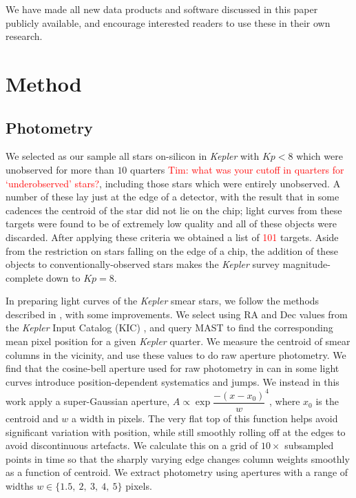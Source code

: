 \documentclass[a4paper,fleqn,usenatbib]{mnras}
\newcommand{\kepler}{\emph{Kepler}\xspace}
\begin{document}
We have made all new data products and software discussed in this paper publicly available, and encourage interested readers to use these in their own research.   

\section{Method}
\label{method}

\subsection{Photometry}
\label{photometry}

We selected as our sample all stars on-silicon in \kepler with $Kp<8$ which were unobserved for more than $10$ quarters \textcolor{red}{Tim: what was your cutoff in quarters for `underobserved' stars?}, including those stars which were entirely unobserved. A number of these lay just at the edge of a detector, with the result that in some cadences the centroid of the star did not lie on the chip; light curves from these targets were found to be of extremely low quality and all of these objects were discarded. After applying these criteria we obtained a list of \textcolor{red}{101} targets. Aside from the restriction on stars falling on the edge of a chip, the addition of these objects to conventionally-observed stars makes the \kepler survey magnitude-complete down to $Kp=8$. 

In preparing light curves of the \kepler smear stars, we follow the methods described in \citet{smear}, with some improvements. We select using RA and Dec values from the \kepler Input Catalog (KIC) \citep{kic}, and query MAST to find the corresponding mean pixel position for a given \kepler quarter. We measure the centroid of smear columns in the vicinity, and use these values to do raw aperture photometry. We find that the cosine-bell aperture used for raw photometry in \citet{smear} can in some light curves introduce position-dependent systematics and jumps. We instead in this work apply a super-Gaussian aperture, $A \propto \exp{\dfrac{-(x-x_0)}{w} ^ 4}$, where $x_0$ is the centroid and $w$ a width in pixels. The very flat top of this function helps avoid significant variation with position, while still smoothly rolling off at the edges to avoid discontinuous artefacts. We calculate this on a grid of $10\times$ subsampled points in time so that the sharply varying edge changes column weights smoothly as a function of centroid. We extract photometry using apertures with a range of widths $w \in\{1.5,~2,~3,~4,~5\}$ pixels.
\end{document}
